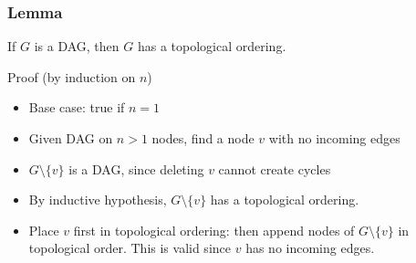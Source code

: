 \documentclass[11pt]{article}
\begin{document}
\subsubsection{Lemma}
\label{sec:orgd3a8ca3}
If \(G\) is a DAG, then \(G\) has a topological ordering.

Proof (by induction on \(n\))
\begin{itemize}
\item Base case: true if \(n=1\)
\item Given DAG on \(n>1\) nodes, find a node \(v\) with no incoming edges
\item \(G \setminus \{v\}\) is a DAG, since deleting \(v\) cannot create cycles
\item By inductive hypothesis, \(G\setminus\{v\}\) has a topological ordering.
\item Place \(v\) first in topological ordering: then append nodes of \(G\setminus \{v\}\) in topological order. This is valid since \(v\) has no incoming edges.
\end{itemize}
\end{document}
